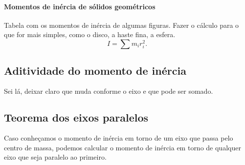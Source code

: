 \begin{marginfigure}
\centering
{}
\caption{.\label{Fig:CompMomInerciaDiscoAnel}}
\end{marginfigure}


\paragraph{Momentos de inércia de sólidos geométricos}

Tabela com os momentos de inércia de algumas figuras. Fazer o cálculo para o que for mais simples, como o disco, a haste fina, a esfera.
\begin{equation}
  I = \sum m_i r_i^2.
\end{equation}

\subsection{Aditividade do momento de inércia}

Sei lá, deixar claro que muda conforme o eixo e que pode ser somado.

\subsection{Teorema dos eixos paralelos}

Caso conheçamos o momento de inércia em torno de um eixo que passa pelo centro de massa, podemos calcular o momento de inércia em torno de qualquer eixo que seja paralelo ao primeiro.

